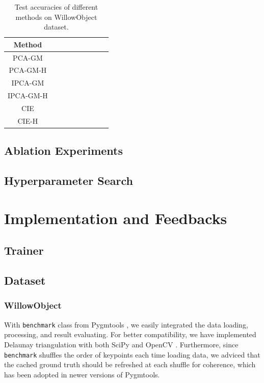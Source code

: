 \documentclass[a4paper]{article}
\begin{document}
\begin{table}[htbp]
    \centering
    \begin{tabular}{ccccccccc}
        \toprule
        Method& \\
        \midrule
        PCA-GM& \\
        PCA-GM-H& \\
        IPCA-GM& \\
        IPCA-GM-H& \\
        CIE& \\
        CIE-H& \\
        \bottomrule
    \end{tabular}
    \caption{Test accuracies of different methods on WillowObject dataset.}
    \label{tab:compare}
\end{table}

\subsection{Ablation Experiments}

\subsection{Hyperparameter Search}



\section{Implementation and Feedbacks}

\subsection{Trainer}

\subsection{Dataset}
\subsubsection{WillowObject}
With \texttt{benchmark} class from Pygmtools \cite{pygmtools}, we easily integrated the data loading, processing, and result evaluating. For better compatibility, we have implemented Delaunay triangulation with both SciPy \cite{scipy} and OpenCV \cite{opencv}. Furthermore, since \texttt{benchmark} shuffles the order of keypoints each time loading data, we adviced that the cached ground truth should be refreshed at each shuffle for coherence, which has been adopted in newer versions of Pygmtools. 
\end{document}

